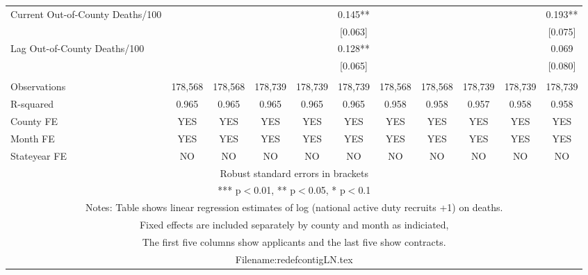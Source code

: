 \documentclass[]{article}
\begin{document}
\begin{tabular}{lcccccccccc}
Current Out-of-County Deaths/100 &  &  &  &  & 0.145** &  &  &  &  & 0.193** \\
 &  &  &  &  & [0.063] &  &  &  &  & [0.075] \\
Lag Out-of-County Deaths/100 &  &  &  &  & 0.128** &  &  &  &  & 0.069 \\
 &  &  &  &  & [0.065] &  &  &  &  & [0.080] \\
 &  &  &  &  &  &  &  &  &  &  \\
Observations & 178,568 & 178,568 & 178,739 & 178,739 & 178,739 & 178,568 & 178,568 & 178,739 & 178,739 & 178,739 \\
R-squared & 0.965 & 0.965 & 0.965 & 0.965 & 0.965 & 0.958 & 0.958 & 0.957 & 0.958 & 0.958 \\
County FE & YES & YES & YES & YES & YES & YES & YES & YES & YES & YES \\
Month FE & YES & YES & YES & YES & YES & YES & YES & YES & YES & YES \\
 Stateyear FE & NO & NO & NO & NO & NO & NO & NO & NO & NO & NO \\ \hline
\multicolumn{11}{c}{ Robust standard errors in brackets} \\
\multicolumn{11}{c}{ *** p$<$0.01, ** p$<$0.05, * p$<$0.1} \\
\multicolumn{11}{c}{ Notes: Table shows linear regression estimates of log (national active duty recruits +1) on deaths.} \\
\multicolumn{11}{c}{ Fixed effects are included separately by county and month as indiciated,} \\
\multicolumn{11}{c}{ The first five columns show applicants and the last five show contracts.} \\
\multicolumn{11}{c}{ Filename:redefcontigLN.tex} \\
\end{tabular}
\end{document}
